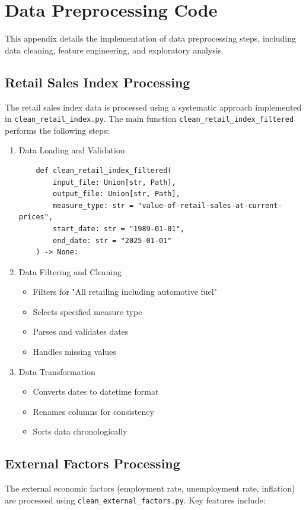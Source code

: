 \documentclass[12pt,a4paper]{report}
\begin{document}
\chapter{Data Preprocessing Code}
\label{appendix:preprocessing}

This appendix details the implementation of data preprocessing steps, including data cleaning, feature engineering, and exploratory analysis.

\section{Retail Sales Index Processing}
The retail sales index data is processed using a systematic approach implemented in \texttt{clean\_retail\_index.py}. The main function \texttt{clean\_retail\_index\_filtered} performs the following steps:

\begin{enumerate}
    \item Data Loading and Validation
    \begin{verbatim}
    def clean_retail_index_filtered(
        input_file: Union[str, Path],
        output_file: Union[str, Path],
        measure_type: str = "value-of-retail-sales-at-current-prices",
        start_date: str = "1989-01-01",
        end_date: str = "2025-01-01"
    ) -> None:
    \end{verbatim}

    \item Data Filtering and Cleaning
\begin{itemize}
        \item Filters for "All retailing including automotive fuel"
        \item Selects specified measure type
        \item Parses and validates dates
        \item Handles missing values
\end{itemize}

    \item Data Transformation
    \begin{itemize}
        \item Converts dates to datetime format
        \item Renames columns for consistency
        \item Sorts data chronologically
    \end{itemize}
\end{enumerate}

\section{External Factors Processing}
The external economic factors (employment rate, unemployment rate, inflation) are processed using \texttt{clean\_external\_factors.py}. Key features include:
\end{document}

